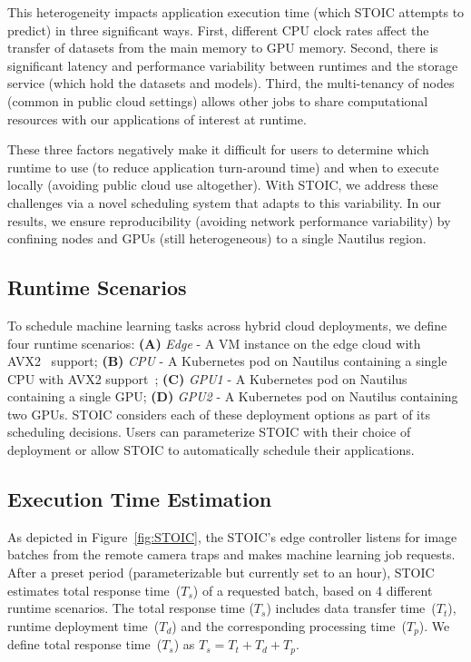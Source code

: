This heterogeneity impacts application execution time (which STOIC attempts to predict) in three significant ways. First, different CPU clock rates affect the transfer of datasets from the main memory to GPU memory. Second, there is significant latency and performance variability between runtimes and the storage service (which hold the datasets and models). Third, the multi-tenancy of nodes (common in public cloud settings) allows other jobs to share computational resources with our applications of interest at runtime. 

These three factors negatively make it difficult for users to determine which runtime to use (to reduce application turn-around time) and when to execute locally (avoiding public  cloud use altogether). With STOIC, we address these challenges via a novel scheduling system that adapts to this variability. In our results, we ensure reproducibility (avoiding network performance variability) by confining nodes and GPUs (still heterogeneous) to a single Nautilus region.

\subsection{Runtime Scenarios}

To schedule machine learning tasks across hybrid cloud deployments, we define four runtime scenarios: \textbf{(A)} \textit{Edge} - A VM instance on the edge cloud with AVX2~\cite{ref:avx} support; \textbf{(B)} \textit{CPU} - A Kubernetes pod on Nautilus containing a single CPU with AVX2 support~\cite{ref:avx}; \textbf{(C)} \textit{GPU1} - A Kubernetes pod on Nautilus containing a single GPU; \textbf{(D)} \textit{GPU2} - A Kubernetes pod on Nautilus containing two GPUs.  STOIC considers each of these deployment options as part of its scheduling decisions. Users can parameterize STOIC with their choice of deployment or allow STOIC to automatically schedule their applications.

\subsection{Execution Time Estimation}

As depicted in Figure~\ref{fig:STOIC}, the STOIC's edge controller listens for image batches from the remote camera traps and makes machine learning job requests. After a preset period (parameterizable but currently set to an hour), STOIC estimates total response time~($T_s$) of a requested batch, based on 4 different runtime scenarios. The total response time ($T_s$) includes data transfer time~($T_t$), runtime deployment time~($T_d$) and the corresponding processing time~($T_p$). We define total response time~($T_s$) as $T_s = T_t + T_d + T_p$.
 
